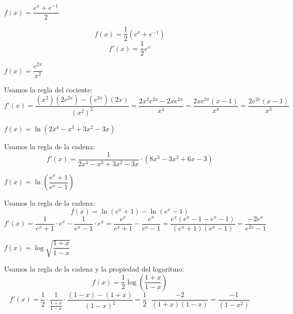 \documentclass[answers]{exam} %
\begin{document}
\begin{questions}
    \question $f(x)=\dfrac{e^x+e^{-1}}{2}$
    \begin{solution}
    \[
    f(x) = \frac{1}{2}(e^x + e^{-1})
    \]
    \[
    f'(x) = \frac{1}{2} e^x
    \]
    \end{solution}
    
    \question $f(x)=\dfrac{e^{2x}}{x^2}$
    \begin{solution}
    Usamos la regla del cociente:
    \[
    f'(x) = \frac{(x^2)(2e^{2x}) - (e^{2x})(2x)}{(x^2)^2} = \frac{2x^2e^{2x} - 2xe^{2x}}{x^4} = \frac{2xe^{2x}(x-1)}{x^4} = \frac{2e^{2x}(x-1)}{x^3}
    \]
    \end{solution}
    
    \question $f(x)=\ln(2x^4-x^3+3x^2-3x)$
    \begin{solution}
    Usamos la regla de la cadena:
    \[
    f'(x) = \frac{1}{2x^4-x^3+3x^2-3x} \cdot (8x^3 - 3x^2 + 6x - 3)
    \]
    \end{solution}
    
    \question $f(x)=\ln\left(\dfrac{e^x+1}{e^x-1}\right)$
    \begin{solution}
    Usamos la regla de la cadena:
    \[
    f(x) = \ln(e^x+1) - \ln(e^x-1)
    \]
    \[
    f'(x) = \frac{1}{e^x+1} \cdot e^x - \frac{1}{e^x-1} \cdot e^x = \frac{e^x}{e^x+1} - \frac{e^x}{e^x-1} = \frac{e^x(e^x-1 - e^x-1)}{(e^x+1)(e^x-1)} = \frac{-2e^x}{e^{2x}-1}
    \]
    \end{solution}
    
    \question $f(x)=\log \sqrt{\dfrac{1+x}{1-x}}$
    \begin{solution}
    Usamos la regla de la cadena y la propiedad del logaritmo:
    \[
    f(x) = \frac{1}{2} \log\left(\frac{1+x}{1-x}\right)
    \]
    \[
    f'(x) = \frac{1}{2} \cdot \frac{1}{\frac{1+x}{1-x}} \cdot \frac{(1-x) - (1+x)}{(1-x)^2} = \frac{1}{2} \cdot \frac{-2}{(1+x)(1-x)} = \frac{-1}{(1-x^2)}
    \]
    \end{solution}

\end{questions}
\end{document}
